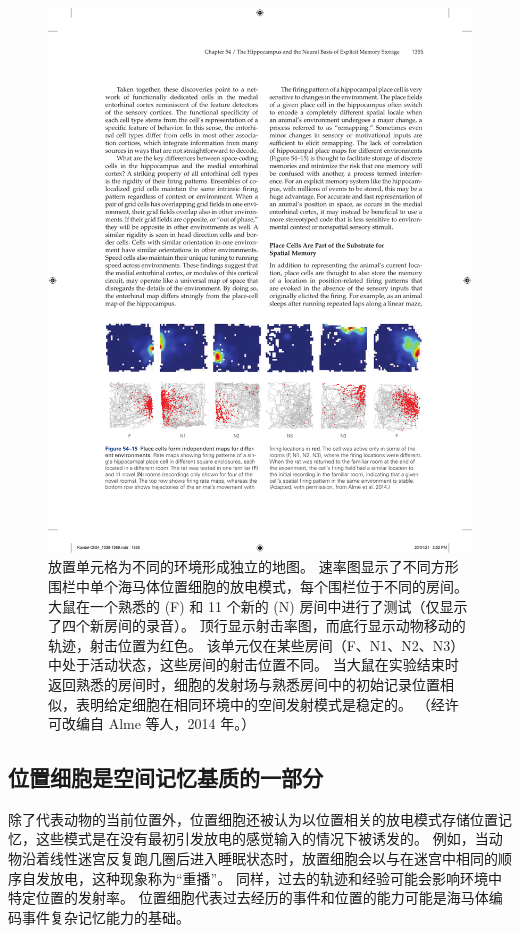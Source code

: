 \begin{figure}[htbp]
	\centering
	\includegraphics[width=0.9\linewidth]{chap54/fig_54_15}
	\caption{放置单元格为不同的环境形成独立的地图。 速率图显示了不同方形围栏中单个海马体位置细胞的放电模式，每个围栏位于不同的房间。 大鼠在一个熟悉的 (F) 和 11 个新的 (N) 房间中进行了测试（仅显示了四个新房间的录音）。 顶行显示射击率图，而底行显示动物移动的轨迹，射击位置为红色。 该单元仅在某些房间（F、N1、N2、N3）中处于活动状态，这些房间的射击位置不同。 当大鼠在实验结束时返回熟悉的房间时，细胞的发射场与熟悉房间中的初始记录位置相似，表明给定细胞在相同环境中的空间发射模式是稳定的。 （经许可改编自 Alme 等人，2014 年。）}
	\label{fig:54_15}
\end{figure}



\subsection{位置细胞是空间记忆基质的一部分}

除了代表动物的当前位置外，位置细胞还被认为以位置相关的放电模式存储位置记忆，这些模式是在没有最初引发放电的感觉输入的情况下被诱发的。
例如，当动物沿着线性迷宫反复跑几圈后进入睡眠状态时，放置细胞会以与在迷宫中相同的顺序自发放电，这种现象称为“重播”。
同样，过去的轨迹和经验可能会影响环境中特定位置的发射率。
位置细胞代表过去经历的事件和位置的能力可能是海马体编码事件复杂记忆能力的基础。


